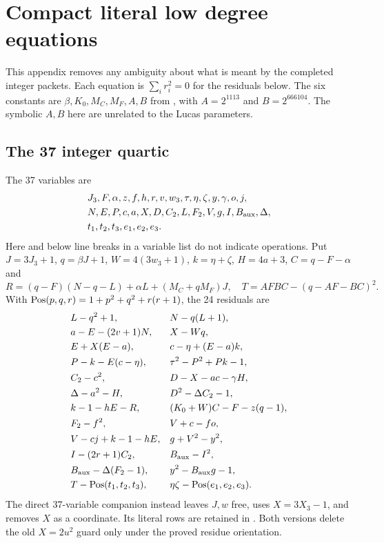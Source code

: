 \section{Compact literal low degree equations}\label{app:low}
This appendix removes any ambiguity about what is meant by the completed
integer packets. Each equation is $\sum_i r_i^2=0$ for the residuals below.
The six constants are $\beta,K_0,M_C,M_F,A,B$ from
, with $A=2^{1113}$ and $B=2^{666104}$.
The symbolic $A,B$ here are unrelated to the Lucas parameters.

\subsection{The 37 integer quartic}
The 37 variables are
\[
\begin{split}
&J_3,F,\alpha,z,f,h,r,v,w_3,\tau,\eta,\zeta,y,\gamma,o,j,\\
&N,E,P,c,a,X,D,C_2,L,F_2,V,g,I,B_{\rm aux},\Delta,\\
&t_1,t_2,t_3,e_1,e_2,e_3.
\end{split}
\]
Here and below line breaks in a variable list do not indicate operations.
Put $J=3J_3+1$, $q=\beta J+1$, $W=4(3w_3+1)$,
$k=\eta+\zeta$, $H=4a+3$, $C=q-F-\alpha$ and
\[
 R=(q-F)(N-q-L)+\alpha L+(M_C+qM_F)J,\quad
 T=AFBC-(q-AF-BC)^2.
\]
With $\operatorname{Pos}(p,q,r)=1+p^2+q^2+r(r+1)$, the 24 residuals are
\begin{align*}
&L-q^2+1, &&N-q(L+1),\\
&a-E-(2v+1)N, &&X-Wq,\\
&E+X(E-a), &&c-\eta+(E-a)k,\\
&P-k-E(c-\eta), &&\tau^2-P^2+Pk-1,\\
&C_2-c^2, &&D-X-ac-\gamma H,\\
&\Delta-a^2-H, &&D^2-\Delta C_2-1,\\
&k-1-hE-R, &&(K_0+W)C-F-z(q-1),\\
&F_2-f^2, &&V+c-fo,\\
&V-cj+k-1-hE, &&g+V^2-y^2,\\
&I-(2r+1)C_2, &&B_{\rm aux}-I^2,\\
&B_{\rm aux}-\Delta(F_2-1), &&y^2-B_{\rm aux}g-1,\\
&T-\operatorname{Pos}(t_1,t_2,t_3), &&\eta\zeta-\operatorname{Pos}(e_1,e_2,e_3).
\end{align*}
The direct 37-variable companion instead leaves $J,w$ free, uses
$X=3X_3-1$, and removes $X$ as a coordinate. Its literal rows are retained
in . Both versions delete the old
$X=2u^2$ guard only under the proved residue orientation.

